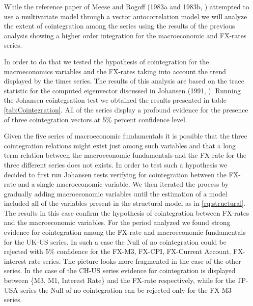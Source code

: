 While the reference paper of Meese and Rogoff (1983a and 1983b, \cite{MeeseRogoffa, MeeseRogoffb}) attempted to use a multivariate model through
a vector autocorrelation model we will analyze the extent of cointegration among the series using the results of the previous analysis
showing a higher order integration for the macroeconomic and FX-rates series.

In order to do that we tested the hypothesis of cointegration for the macroeconomics variables and the FX-rates taking into account the
trend displayed by the times series. The results of this analysis are based on the trace statistic for the computed eigenvector discussed in Johansen (1991,
\cite{Johansen}). Running the Johansen cointegration test we obtained the results presented in table \ref{tab:Cointegration}. All of
the series display a profound evidence for the presence of three cointegration vectors at 5\% percent confidence level.

Given the five series of macroeconomic fundamentals it is possible that the three cointegration relations might exist just among such variables and that a
long term relation between the macroeconomic fundamentals and the FX-rate for the three different series does not exists. In order to test
such a hypothesis we decided to first run Johansen tests verifying for cointegration between the FX-rate and a single macroeconomic variable. We then
iterated the process by gradually adding macroeconomic variables until the estimation of a model included all of the variables present in the
structural model as in \ref{eq:structural}. The results in this case confirm the hypothesis of cointegration between FX-rates and the macroeconomic variables.
For the period analyzed we found strong evidence for cointegration among the FX-rate and macroeconomic fundamentals for the UK-US series. In
such a case the Null of no cointegration could be rejected with 5\% confidence for the FX-M3, FX-CPI, FX-Current Account, FX-interest rate series.
The picture looks more fragmented in the case of the other series. In the case of the CH-US series evidence for cointegration is displayed
between \{M3, M1, Interest Rate\} and the FX-rate respectively, while for the JP-USA series the Null of no cointegration can be rejected only for the FX-M3
series.

